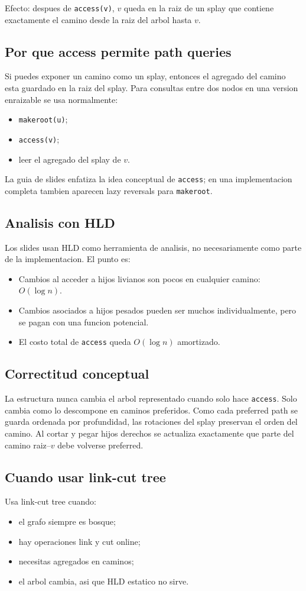 \documentclass[10pt]{article}
\newcommand{\bigO}{O}
\begin{document}
Efecto: despues de \texttt{access(v)}, $v$ queda en la raiz de un splay que
contiene exactamente el camino desde la raiz del arbol hasta $v$.

\subsection{Por que access permite path queries}
Si puedes exponer un camino como un splay, entonces el agregado del camino esta
guardado en la raiz del splay. Para consultas entre dos nodos en una version
enraizable se usa normalmente:
\begin{itemize}[leftmargin=*]
\item \texttt{makeroot(u)};
\item \texttt{access(v)};
\item leer el agregado del splay de $v$.
\end{itemize}
La guia de slides enfatiza la idea conceptual de \texttt{access}; en una
implementacion completa tambien aparecen lazy reversals para \texttt{makeroot}.

\subsection{Analisis con HLD}
Los slides usan HLD como herramienta de analisis, no necesariamente como parte
de la implementacion. El punto es:
\begin{itemize}[leftmargin=*]
\item Cambios al acceder a hijos livianos son pocos en cualquier camino:
$\bigO(\log n)$.
\item Cambios asociados a hijos pesados pueden ser muchos individualmente, pero
se pagan con una funcion potencial.
\item El costo total de \texttt{access} queda $\bigO(\log n)$ amortizado.
\end{itemize}

\subsection{Correctitud conceptual}
La estructura nunca cambia el arbol representado cuando solo hace \texttt{access}.
Solo cambia como lo descompone en caminos preferidos. Como cada preferred path
se guarda ordenada por profundidad, las rotaciones del splay preservan el orden
del camino. Al cortar y pegar hijos derechos se actualiza exactamente que parte
del camino raiz--$v$ debe volverse preferred.

\subsection{Cuando usar link-cut tree}
Usa link-cut tree cuando:
\begin{itemize}[leftmargin=*]
\item el grafo siempre es bosque;
\item hay operaciones link y cut online;
\item necesitas agregados en caminos;
\item el arbol cambia, asi que HLD estatico no sirve.
\end{itemize}
\end{document}
